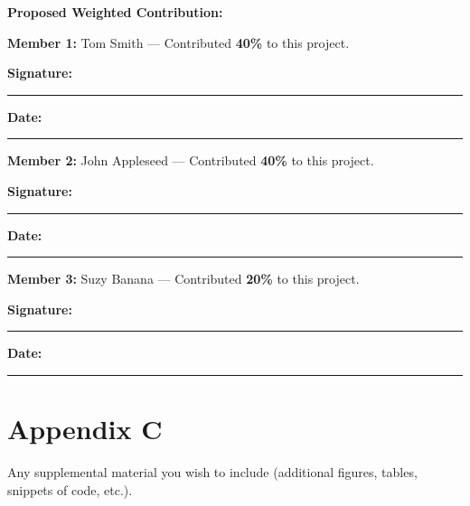 \begingroup
\RaggedRight

\textbf{Proposed Weighted Contribution:}
\par\bigskip

\textbf{Member 1:} Tom Smith --- Contributed
\textbf{40\%} to this project.
\par\medskip
\textbf{Signature:} \rule{0.36\linewidth}{0.4pt}
\hfill
\textbf{Date:} \rule{0.18\linewidth}{0.4pt}
\par\bigskip

\textbf{Member 2:} John Appleseed --- Contributed
\textbf{40\%} to this project.
\par\medskip
\textbf{Signature:} \rule{0.36\linewidth}{0.4pt}
\hfill
\textbf{Date:} \rule{0.18\linewidth}{0.4pt}
\par\bigskip

\textbf{Member 3:} Suzy Banana --- Contributed
\textbf{20\%} to this project.
\par\medskip
\textbf{Signature:} \rule{0.36\linewidth}{0.4pt}
\hfill
\textbf{Date:} \rule{0.18\linewidth}{0.4pt}
\par

\endgroup

\clearpage

\section*{Appendix C}
\label{app:C}

\noindent
Any supplemental material you wish to include
(additional figures, tables, snippets of code, etc.).